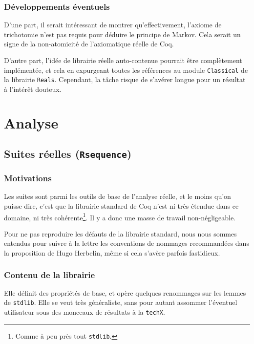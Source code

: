 \documentclass{article}
\newcommand{\coqcode}[1]{\texttt{#1}}
\begin{document}
\subsubsection{Développements éventuels}

D'une part, il serait intéressant de montrer qu'effectivement, l'axiome de trichotomie n'est pas requis pour déduire le principe de Markov. Cela serait un signe de la non-atomicité de l'axiomatique réelle de Coq.

D'autre part, l'idée de librairie réelle auto-contenue pourrait être complètement implémentée, et cela en expurgeant toutes les références au module \coqcode{Classical} de la librairie \coqcode{Reals}. Cependant, la tâche risque de s'avérer longue pour un résultat à l'intérêt douteux.

\section{Analyse}

\subsection{Suites réelles (\coqcode{Rsequence})}

\subsubsection{Motivations}

Les suites sont parmi les outils de base de l'analyse réelle, et le moins qu'on puisse dire, c'est que la librairie standard de Coq n'est ni très étendue dans ce domaine, ni très cohérente\footnote{Comme à peu près tout \coqcode{stdlib}.}. Il y a donc une masse de travail non-négligeable.

Pour ne pas reproduire les défauts de la librairie standard, nous nous sommes entendus pour suivre à la lettre les conventions de nommages recommandées dans la proposition de Hugo Herbelin, même si cela s'avère parfois fastidieux.

\subsubsection{Contenu de la librairie}

Elle définit des propriétés de base, et opère quelques renommages sur les lemmes de \coqcode{stdlib}. Elle se veut très généraliste, sans pour autant assommer l'éventuel utilisateur sous des monceaux de résultats à la \coqcode{techX}.
\end{document}
